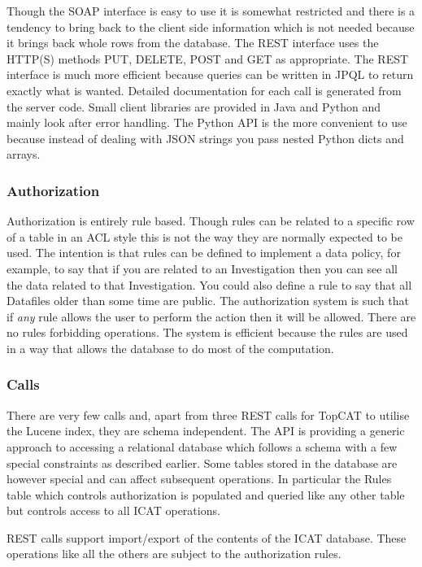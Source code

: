 \documentclass[a4paper]{jpconf}
\begin{document}
Though the SOAP interface is easy to use it is somewhat restricted and
there is a tendency to bring back to the client side information which
is not needed because it brings back whole rows from the database. The
REST interface uses the HTTP(S) methods PUT, DELETE, POST and GET as
appropriate. The REST interface is much more efficient because queries
can be written in JPQL to return exactly what is wanted. Detailed
documentation for each call is generated from the server code.  Small
client libraries are provided in Java and Python and mainly look after
error handling.  The Python API is the more convenient to use because
instead of dealing with JSON strings you pass nested Python dicts and
arrays.

\subsubsection{Authorization}
Authorization is entirely rule based. Though rules can be related to a
specific row of a table in an ACL style this is not the way they are
normally expected to be used. The intention is that rules can be
defined to implement a data policy, for example, to say that if you
are related to an Investigation then you can see all the data related
to that Investigation. You could also define a rule to say that all
Datafiles older than some time are public. The authorization system is
such that if \emph{any} rule allows the user to perform the action
then it will be allowed. There are no rules forbidding operations. The
system is efficient because the rules are used in a way that allows
the database to do most of the computation.

\subsubsection{Calls}
There are very few calls and, apart from three REST calls for TopCAT
to utilise the Lucene index, they are schema independent. The API is
providing a generic approach to accessing a relational database which
follows a schema with a few special constraints as described
earlier. Some tables stored in the database are however special and
can affect subsequent operations. In particular the Rules table which
controls authorization is populated and queried like any other table
but controls access to all ICAT operations.

REST calls support import/export of the contents of the ICAT
database. These operations like all the others are subject to the
authorization rules.
\end{document}
